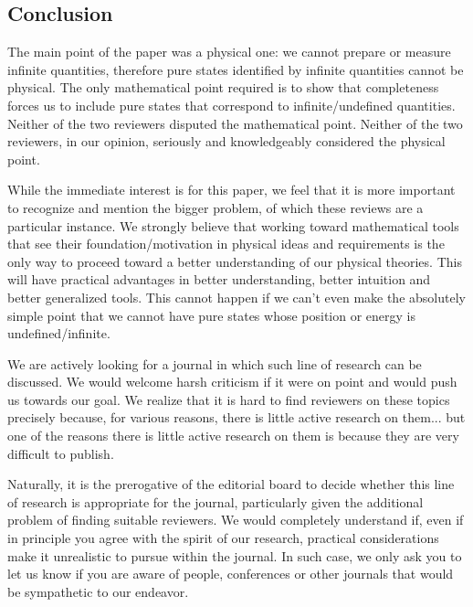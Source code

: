 \documentclass[11pt, executivepaper]{article}
\begin{document}
\subsection*{Conclusion}

The main point of the paper was a physical one: we cannot prepare or measure infinite quantities, therefore pure states identified by infinite quantities cannot be physical. The only mathematical point required is to show that completeness forces us to include pure states that correspond to infinite/undefined quantities. Neither of the two reviewers disputed the mathematical point. Neither of the two reviewers, in our opinion, seriously and knowledgeably considered the physical point.

While the immediate interest is for this paper, we feel that it is more important to recognize and mention the bigger problem, of which these reviews are a particular instance. We strongly believe that working toward mathematical tools that see their foundation/motivation in physical ideas and requirements is the only way to proceed toward a better understanding of our physical theories. This will have practical advantages in better understanding, better intuition and better generalized tools. This cannot happen if we can't even make the absolutely simple point that we cannot have pure states whose position or energy is undefined/infinite.

We are actively looking for a journal in which such line of research can be discussed. We would welcome harsh criticism if it were on point and would push us towards our goal. We realize that it is hard to find reviewers on these topics precisely because, for various reasons, there is little active research on them... but one of the reasons there is little active research on them is because they are very difficult to publish.

Naturally, it is the prerogative of the editorial board to decide whether this line of research is appropriate for the journal, particularly given the additional problem of finding suitable reviewers. We would completely understand if, even if in principle you agree with the spirit of our research, practical considerations make it unrealistic to pursue within the journal. In such case, we only ask you to let us know if you are aware of people, conferences or other journals that would be sympathetic to our endeavor.


%
%
\end{document}

